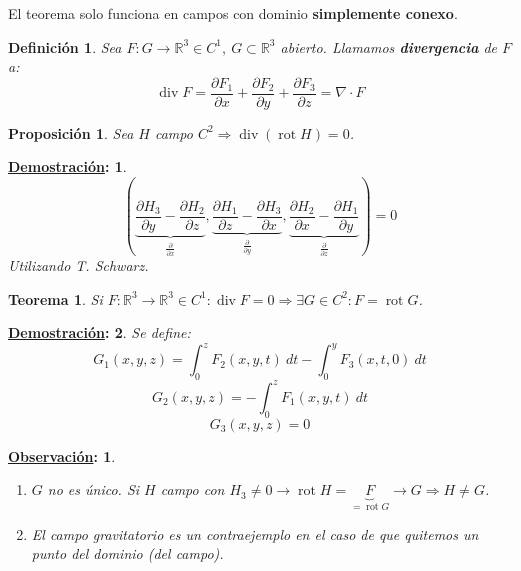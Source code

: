 \documentclass[10pt,a4paper,openright]{book}
\theoremstyle{break}
\newtheorem*{defi}{Definición}
\newtheorem*{theo}{Teorema}
\newtheorem*{prop}{Proposición}
\newtheorem*{demo}{\underline{Demostración}:}
\newtheorem*{obs}{\underline{Observación}:}
\DeclareMathOperator{\rot}{rot}
\DeclareMathOperator{\divg}{div}
\newcommand{\dif}[1]{\ d#1}
\begin{document}
El teorema solo funciona en campos con dominio \textbf{simplemente conexo}. 

\begin{defi}
Sea $F: G \rightarrow \mathbb{R}^3 \in C^1,\ G \subset \mathbb{R}^3$ abierto. Llamamos \textbf{divergencia} de $F$ a: 
$$\divg F = \frac{\partial F_1}{\partial x} + \frac{\partial F_2}{\partial y} + \frac{\partial F_3}{\partial z} = \nabla \cdot F$$
\end{defi}
\begin{prop}
Sea $H$ campo $C^2 \Rightarrow \divg \left( \rot H \right) = 0$. 
\end{prop}
\begin{demo}
$$\left( \underbrace{\frac{\partial H_3}{\partial y} - \frac{\partial H_2}{\partial z}}_{\frac{\partial }{\partial x}}, \underbrace{\frac{\partial H_1}{\partial z} - \frac{\partial H_3}{\partial x}}_{\frac{\partial }{\partial y}}, \underbrace{\frac{\partial H_2}{\partial x} - \frac{\partial H_1}{\partial y}}_{\frac{\partial }{\partial z}} \right) = 0$$
Utilizando T. Schwarz.
\end{demo}

\begin{theo}
Si $F: \mathbb{R}^3 \rightarrow \mathbb{R}^3 \in C^1 : \divg F = 0 \Rightarrow \exists G \in C^2 : F = \rot G$.
\end{theo}
\begin{demo}
Se define: 
$$G_1\left( x, y, z \right) = \int_{0}^{z} F_2\left( x, y, t \right) \dif{t} - \int_{0}^{y} F_3\left( x, t, 0 \right) \dif{t}$$
$$G_2\left( x, y, z \right) = -\int_{0}^{z} F_1\left( x, y, t \right) \dif{t}$$
$$G_3\left( x, y, z \right) = 0$$
\end{demo}
\begin{obs}
\begin{enumerate}
    \item $G$ no es único. Si $H$ campo con $H_3 \neq 0 \rightarrow \rot H = \underbrace{F}_{= \rot G} \rightarrow G \Rightarrow H \neq G$.

    \item El campo gravitatorio es un contraejemplo en el caso de que quitemos un punto del dominio (del campo).
\end{enumerate}
\end{obs}
\end{document}
